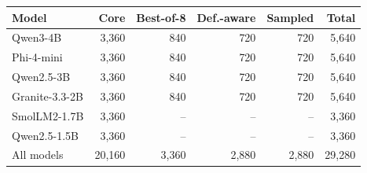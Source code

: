 \begin{tabular}{@{}lrrrrr@{}}
\toprule
Model & Core & Best-of-8 & Def.-aware & Sampled & Total \\
\midrule
Qwen3-4B & 3,360 & 840 & 720 & 720 & 5,640 \\
Phi-4-mini & 3,360 & 840 & 720 & 720 & 5,640 \\
Qwen2.5-3B & 3,360 & 840 & 720 & 720 & 5,640 \\
Granite-3.3-2B & 3,360 & 840 & 720 & 720 & 5,640 \\
SmolLM2-1.7B & 3,360 & -- & -- & -- & 3,360 \\
Qwen2.5-1.5B & 3,360 & -- & -- & -- & 3,360 \\
\midrule
All models & 20,160 & 3,360 & 2,880 & 2,880 & 29,280 \\
\bottomrule
\end{tabular}